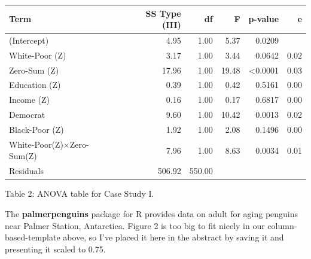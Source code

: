 \documentclass{article}\usepackage[]{graphicx}\usepackage[]{xcolor}
\begin{document}
\begin{table}[H]
\begin{center}
\begin{tabular}{ l  r  r  r  r  r }\hline
Term & SS Type (III) & df & F & p-value & e \\\hline
(Intercept) & 4.95 & 1.00 & 5.37 & 0.0209 & \\
White-Poor (Z) & 3.17 & 1.00 & 3.44 & 0.0642 & 0.02 \\
Zero-Sum (Z) & 17.96 & 1.00 & 19.48 & <0.0001 & 0.03 \\
Education (Z) & 0.39 & 1.00 & 0.42 & 0.5161 & 0.00 \\
Income (Z) & 0.16 & 1.00 & 0.17 & 0.6817 & 0.00 \\
Democrat & 9.60 & 1.00 & 10.42 & 0.0013 & 0.02 \\
Black-Poor (Z) & 1.92 & 1.00 & 2.08 & 0.1496 & 0.00 \\
White-Poor(Z)×Zero-Sum(Z) & 7.96 & 1.00 & 8.63 & 0.0034 & 0.01 \\
Residuals & 506.92 & 550.00 & & & \\\hline
\end{tabular}
\end{center}
\end{table}
\begin{center}
Table 2: ANOVA table for Case Study I.
\end{center}

The \textbf{palmerpenguins} package for R \citep{palmerpenguins} provides data on adult for aging penguins near Palmer Station, Antarctica. Figure 2 is too big to fit nicely in our column-based-template above, so I’ve placed it here in the abstract by saving it and presenting it scaled to 0.75.
\end{document}
